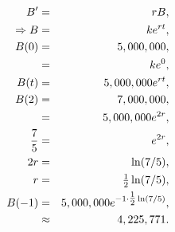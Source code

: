\begin{problem}
{        \begin{eqnarray*}
          B' & = & r B, \\
          \Rightarrow B & = & ke^{rt}, \\
          B(0) & = & 5,000,000, \\
          & = & k e^0, \\
          B(t) & = & 5,000,000 e^{rt}, \\
          B(2) & = & 7,000,000, \\
          & = & 5,000,000 e^{2r}, \\
          \frac{7}{5} & = & e^{2r}, \\
          2r & = & \ln(7/5), \\
          r & = & \mbox{$\frac{1}{2}$} \ln(7/5), \\
          B(-1) & = & 5,000,000 e^{-1 \cdot \mbox{$\frac{1}{2}$} \ln(7/5)}, \\
          & \approx & 4,225,771.
        \end{eqnarray*}

      }

    \vfill
  \end{problem}



